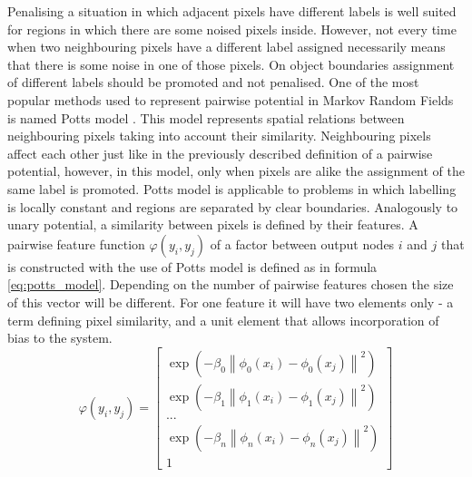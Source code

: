 Penalising a situation in which adjacent pixels have different labels is well suited for regions in which there are some noised pixels inside. However, not every time when two neighbouring pixels have a different label assigned necessarily means that there is some noise in one of those pixels. On object boundaries assignment of different labels should be promoted and not penalised. One of the most popular methods used to represent pairwise potential in Markov Random Fields is named Potts model \cite{potts_model}. This model represents spatial relations between neighbouring pixels taking into account their similarity. Neighbouring pixels affect each other just like in the previously described definition of a pairwise potential, however, in this model, only when pixels are alike the assignment of the same label is promoted. Potts model is applicable to problems in which labelling is locally constant and regions are separated by clear boundaries. Analogously to unary potential, a similarity between pixels is defined by their features. A pairwise feature function $\varphi(y_i,y_j)$ of a factor between output nodes $i$ and $j$ that is constructed with the use of Potts model is defined as in formula \ref{eq:potts_model}. Depending on the number of pairwise features chosen the size of this vector will be different. For one feature it will have two elements only - a term defining pixel similarity, and a unit element that allows incorporation of bias to the system.
\begin{equation}
    \label{eq:potts_model}
    \varphi(y_i,y_j) = \begin{bmatrix}
        \exp{(-\beta_0 \left \| \phi_0(x_i) - \phi_0(x_j)\right \|^2)} \\
        \exp{(-\beta_1 \left \| \phi_1(x_i) - \phi_1(x_j)\right \|^2)} \\
        ...             \\
        \exp{(-\beta_n \left \| \phi_n(x_i) - \phi_n(x_j)\right \|^2)} \\
        1
    \end{bmatrix}
\end{equation}

